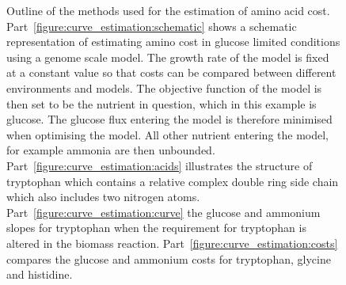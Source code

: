 \begin{figure}
  \hfill
  \hfill
  \hfill
  \hfill
  \label{figure:curve_estimation}
  \caption[Methods used for estimation of amino acid cost]{Outline of the methods used for the estimation of amino acid cost. Part~\ref{figure:curve_estimation:schematic} shows a schematic representation of estimating amino cost in glucose limited conditions using a genome scale model. The growth rate of the model is fixed at a constant value so that costs can be compared  between different environments and models. The objective function of the model is then set to be the nutrient in question, which in this example is glucose. The glucose flux entering the model is therefore minimised when optimising the model. All other nutrient entering the model, for example ammonia are then unbounded. Part~\ref{figure:curve_estimation:acids} illustrates the structure of tryptophan which contains a relative complex double ring side chain which also includes two nitrogen atoms. Part~\ref{figure:curve_estimation:curve} the glucose and ammonium slopes for tryptophan when the requirement for tryptophan is altered in the biomass reaction. Part~\ref{figure:curve_estimation:costs} compares the glucose and ammonium costs for tryptophan, glycine and histidine. }
\end{figure}

